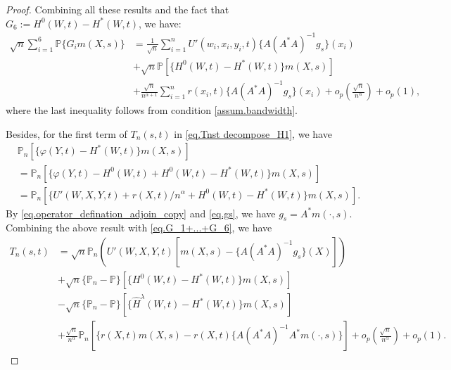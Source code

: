 \documentclass[
  12pt]{article}
\def\mE{\mathbb{E}}
\def\mP{\mathbb{P}}
\def\cH{\mathcal{H}}
\def\mE{\mathbb{E}}
\begin{document}
\begin{proof}
Combining all these results and the fact that $G_6:=H^0(W,t)-H^*(W,t)$, we have:
\begin{align}
    \sqrt{n}\sum_{i=1}^6{\mathbb{P}\{G_im(X,s)\}} & = \frac{1}{\sqrt{n}}\sum_{i=1}^{n}U'(w_{i},x_i,y_{i},t)\{A(A^{*}A)^{-1}g_{s}\}(x_{i})\nonumber\\
    &+\sqrt{n}\mathbb{P}[\{H^0(W,t)-H^*(W,t)\}m(X,s)]\nonumber\\   
&+\frac{\sqrt{n}}{n^{\alpha+1}}\sum_{i=1}^n{r(x_i,t) \{A(A^*A)^{-1}g_s\}(x_i)}+o_p\left(\frac{\sqrt{n}}{n^{\alpha}}\right)+o_p(1) \label{eq.G_1+...+G_6},
\end{align}
where the last inequality follows from condition \ref{assum.bandwidth}.



Besides, for the first term of $T_n(s,t)$ in \eqref{eq.Tnst decompose_H1}, we have
\begin{align*}
	&\mathbb{P}_n[ \{\varphi (Y,t)-H^*(W,t)\}m(X,s) ]\\ &=\mathbb{P}_n[ \{\varphi (Y,t)-H^0(W,t)+H^0(W,t)-H^*(W,t)\}m(X,s) ]\\
	&=\mathbb{P}_n[ \{U'(W,X,Y,t)+r(X,t)/n^{\alpha} +H^0(W,t)-H^*(W,t)\}m(X,s)].
\end{align*}
By \eqref{eq.operator_defination_adjoin_copy} and \eqref{eq.gs}, we have $g_s=A^*m(\cdot,s)$. Combining the above result with \eqref{eq.G_1+...+G_6}, we have
\begin{align*}
	T_n(s,t)&=\sqrt{n}\mathbb{P}_n\left( U'(W,X,Y,t)[ m(X,s)-\{A(A^*A)^{-1}g_s\}(X)] \right)\\
    &+\sqrt{n}\{\mathbb{P}_n-\mP\}[\{H^0(W,t)-H^*(W,t)\}m(X,s)]\\
    &-\sqrt{n}\{\mathbb{P}_n-\mP\}[\{\widehat{H}^\lambda(W,t)-H^*(W,t)\}m(X,s)]\\
    &+\frac{\sqrt{n}}{n^\alpha}\mP_n[\{r(X,t)m(X,s)-r(X,t)\{A(A^*A)^{-1}A^*m(\cdot,s)\}] +o_p\left( \frac{\sqrt{n}}{n^{\alpha}} \right)+o_p(1).
\end{align*}


\end{proof}
\end{document}
